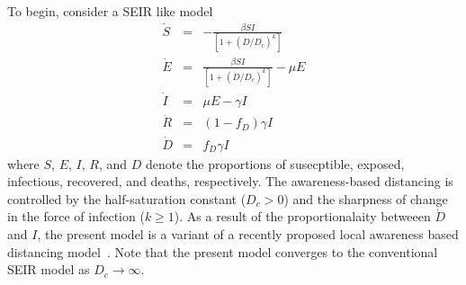 To begin, consider a SEIR like model
\begin{eqnarray}
\dot{S} &=& -\frac{\beta SI}{\left[1+\left(\dot{D}/D_c\right)^{k}\right]}\\
\dot{E} &=& \frac{\beta SI}{\left[1+\left(\dot{D}/D_c\right)^{k}\right]}-\mu E\\
\dot{I} &=& \mu E-\gamma I \\
\dot{R} &=& (1-f_D)\gamma I\\
\dot{D} &=& f_D\gamma I
\end{eqnarray}
where $S$, $E$, $I$, $R$, and $D$ denote the proportions of
susecptible, exposed, infectious, recovered, and deaths, respectively.
The awareness-based distancing is controlled by 
the half-saturation constant ($D_c>0$) and
the sharpness of change in the force of infection ($k\geq 1$).
As a result of the proportionalaity
betweeen $\dot{D}$ and $I$, the present model is a variant of a recently proposed
local awareness based distancing model~\citep{eksin_2019}.
Note that the present
model converges to the conventional SEIR model as $D_c\rightarrow \infty$.
